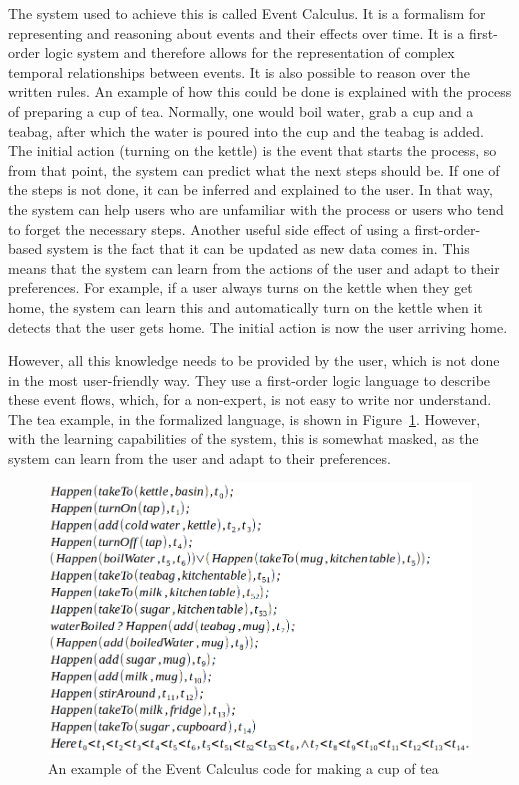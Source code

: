 \documentclass[11pt,a4paper]{report}
\begin{document}
The system used to achieve this is called Event Calculus. It is a formalism for representing and reasoning about events and their effects over time. It is a first-order logic system and therefore allows for the representation of complex temporal relationships between events. It is also possible to reason over the written rules. An example of how this could be done is explained with the process of preparing a cup of tea. Normally, one would boil water, grab a cup and a teabag, after which the water is poured into the cup and the teabag is added. The initial action (turning on the kettle) is the event that starts the process, so from that point, the system can predict what the next steps should be. If one of the steps is not done, it can be inferred and explained to the user. In that way, the system can help users who are unfamiliar with the process or users who tend to forget the necessary steps. Another useful side effect of using a first-order-based system is the fact that it can be updated as new data comes in. This means that the system can learn from the actions of the user and adapt to their preferences. For example, if a user always turns on the kettle when they get home, the system can learn this and automatically turn on the kettle when it detects that the user gets home. The initial action is now the user arriving home.

However, all this knowledge needs to be provided by the user, which is not done in the most user-friendly way. They use a first-order logic language to describe these event flows, which, for a non-expert, is not easy to write nor understand. The tea example, in the formalized language, is shown in Figure~\ref{fig:event_code}. However, with the learning capabilities of the system, this is somewhat masked, as the system can learn from the user and adapt to their preferences.

\begin{figure}
    \centering
    \includegraphics[width=0.8\linewidth]{images/event_code.png}
    \caption{An example of the Event Calculus code for making a cup of tea~\cite{SOTA_EventCalculus}}
    \label{fig:event_code}
\end{figure}
\end{document}
